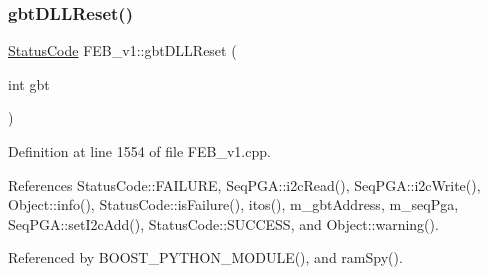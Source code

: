 \subsubsection{\texorpdfstring{gbt\+D\+L\+L\+Reset()}{gbtDLLReset()}}
{\footnotesize\ttfamily \hyperlink{classStatusCode}{Status\+Code} F\+E\+B\+\_\+v1\+::gbt\+D\+L\+L\+Reset (\begin{DoxyParamCaption}\item[{int}]{gbt }\end{DoxyParamCaption})}



Definition at line 1554 of file F\+E\+B\+\_\+v1.\+cpp.



References Status\+Code\+::\+F\+A\+I\+L\+U\+RE, Seq\+P\+G\+A\+::i2c\+Read(), Seq\+P\+G\+A\+::i2c\+Write(), Object\+::info(), Status\+Code\+::is\+Failure(), itos(), m\+\_\+gbt\+Address, m\+\_\+seq\+Pga, Seq\+P\+G\+A\+::set\+I2c\+Add(), Status\+Code\+::\+S\+U\+C\+C\+E\+SS, and Object\+::warning().



Referenced by B\+O\+O\+S\+T\+\_\+\+P\+Y\+T\+H\+O\+N\+\_\+\+M\+O\+D\+U\+L\+E(), and ram\+Spy().


